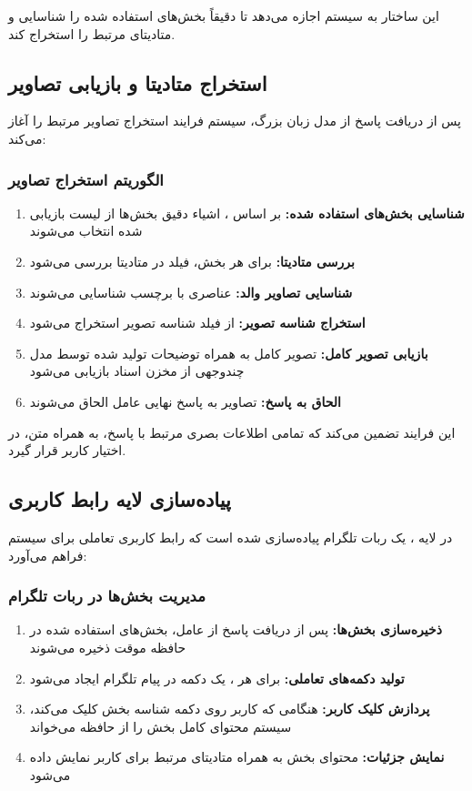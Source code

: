 این ساختار به سیستم اجازه می‌دهد تا دقیقاً بخش‌های استفاده شده را شناسایی و متادیتای مرتبط را استخراج کند.

\subsection{استخراج متادیتا و بازیابی تصاویر}
پس از دریافت پاسخ از مدل زبان بزرگ، سیستم فرایند استخراج تصاویر مرتبط را آغاز می‌کند:

\subsubsection*{الگوریتم استخراج تصاویر}
\begin{enumerate}
    \item \textbf{شناسایی بخش‌های استفاده شده:} بر اساس ، اشیاء دقیق بخش‌ها از لیست بازیابی شده انتخاب می‌شوند
    \item \textbf{بررسی متادیتا:} برای هر بخش، فیلد  در متادیتا بررسی می‌شود
    \item \textbf{شناسایی تصاویر والد:} عناصری با برچسب  شناسایی می‌شوند
    \item \textbf{استخراج شناسه تصویر:} از فیلد  شناسه تصویر استخراج می‌شود
    \item \textbf{بازیابی تصویر کامل:} تصویر کامل به همراه توضیحات تولید شده توسط مدل چندوجهی از مخزن اسناد بازیابی می‌شود
    \item \textbf{الحاق به پاسخ:} تصاویر به پاسخ نهایی عامل الحاق می‌شوند
\end{enumerate}

این فرایند تضمین می‌کند که تمامی اطلاعات بصری مرتبط با پاسخ، به همراه متن، در اختیار کاربر قرار گیرد.

\subsection{پیاده‌سازی لایه رابط کاربری}
در لایه ، یک ربات تلگرام پیاده‌سازی شده است که رابط کاربری تعاملی برای سیستم فراهم می‌آورد:

\subsubsection*{مدیریت بخش‌ها در ربات تلگرام}
\begin{enumerate}
    \item \textbf{ذخیره‌سازی بخش‌ها:} پس از دریافت پاسخ از عامل، بخش‌های استفاده شده در حافظه موقت ذخیره می‌شوند
    \item \textbf{تولید دکمه‌های تعاملی:} برای هر ، یک دکمه  در پیام تلگرام ایجاد می‌شود
    \item \textbf{پردازش کلیک کاربر:} هنگامی که کاربر روی دکمه شناسه بخش کلیک می‌کند، سیستم محتوای کامل بخش را از حافظه می‌خواند
    \item \textbf{نمایش جزئیات:} محتوای بخش به همراه متادیتای مرتبط برای کاربر نمایش داده می‌شود
\end{enumerate}

